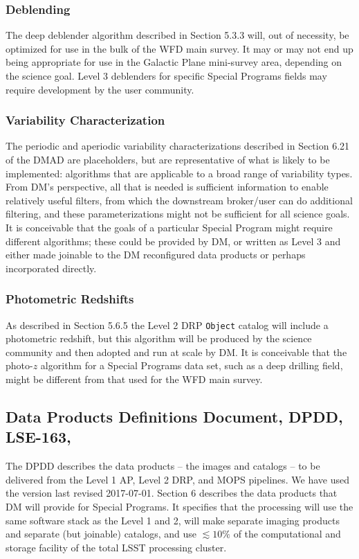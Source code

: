 \documentclass[DM,lsstdraft,toc]{lsstdoc}
\begin{document}
\subsubsection{Deblending} The deep deblender algorithm described in Section 5.3.3 will, out of necessity, be optimized for use in the bulk of the WFD main survey. It may or may not end up being appropriate for use in the Galactic Plane mini-survey area, depending on the science goal. Level 3 deblenders for specific Special Programs fields may require development by the user community.

\subsubsection{Variability Characterization} The periodic and aperiodic variability characterizations described in Section 6.21 of the DMAD are placeholders, but are representative of what is likely to be implemented: algorithms that are applicable to a broad range of variability types. From DM's perspective, all that is needed is sufficient information to enable relatively useful filters, from which the downstream broker/user can do additional filtering, and these parameterizations might not be sufficient for all science goals. It is conceivable that the goals of a particular Special Program might require different algorithms; these could be provided by DM, or written as Level 3 and either made joinable to the DM reconfigured data products or perhaps incorporated directly.

\subsubsection{Photometric Redshifts} As described in Section 5.6.5 the Level 2 DRP {\tt Object} catalog will include a photometric redshift, but this algorithm will be produced by the science community and then adopted and run at scale by DM. It is conceivable that the photo-$z$ algorithm for a Special Programs data set, such as a deep drilling field, might be different from that used for the WFD main survey.

\subsection{Data Products Definitions Document, DPDD, LSE-163, \cite{LSE-163}}\label{ssec:docrev_dpdd}

The DPDD describes the data products -- the images and catalogs -- to be delivered from the Level 1 AP, Level 2 DRP, and MOPS pipelines. We have used the version last revised 2017-07-01. Section 6 describes the data products that DM will provide for Special Programs. It specifies that the processing will use the same software stack as the Level 1 and 2, will make separate imaging products and separate (but joinable) catalogs, and use $\lesssim10\%$ of the computational and storage facility of the total LSST processing cluster.
\end{document}
